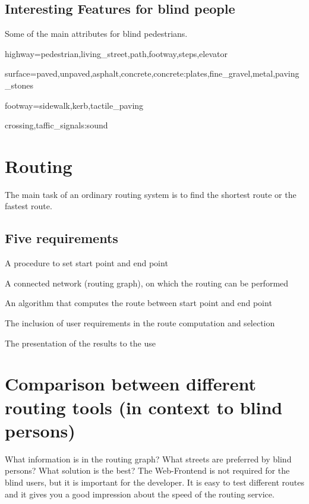 \documentclass{sig-alternate}
\begin{document}
\subsection{Interesting Features for blind people}
Some of the main attributes for blind pedestrians.
\begin{description}
  \item highway=pedestrian,living\_street,path,footway,steps,elevator
  \item surface=paved,unpaved,asphalt,concrete,concrete:plates,fine\_gravel,metal,paving\_stones
  \item footway=sidewalk,kerb,tactile\_paving
  \item crossing,taffic\_signals:sound  
\end{description}

\section{Routing}
The main task of an ordinary routing system is to find the shortest route or the fastest route. 
\subsection{Five requirements\cite{weyrer}}
\begin{description}
  \item A procedure to set start point and end point
  \item A connected network (routing graph), on which the routing can be performed
  \item An algorithm that computes the route between start point and end point
  \item The inclusion of user requirements in the route computation and selection
  \item The presentation of the results to the use
\end{description}


\section{Comparison between different routing tools (in context to blind persons)}

What information is in the routing graph? What streets are preferred by blind persons? What solution is the best?
The Web-Frontend is not required for the blind users, but it is important for the developer. It is easy to test different routes and it gives you a good impression about the speed of the routing service.
\end{document}
